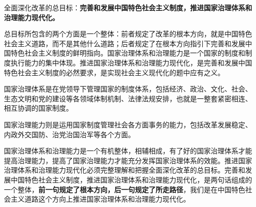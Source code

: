 { }

全面深化改革的总目标：{\textbf{完善和发展中国特色社会主义制度，推进国家治理体系和治理能力现代化。}}

{总目标所包含的两个方面是一个整体：前者规定了改革的根本方向，就是中国特色社会主义道路，而不是其他什么道路；后者规定了在根本方向指引下完善和发展中国特色社会主义制度的鲜明指向。国家治理体系和治理能力是一个国家的制度和制度执行能力的集中体现。推进国家治理体系和治理能力现代化，是完善和发展中国特色社会主义制度的必然要求，是实现社会主义现代化的题中应有之义。}



{{国家治理体系}是在党领导下管理国家的制度体系，包括经济、政治、文化、社会、生态文明和党的建设等各领域体制机制、法律法规安排，也就是一整套紧密相连、相互协调的国家制度。~}

{{国家治理能力}则是运用国家制度管理社会各方面事务的能力，包括改革发展稳定、内政外交国防、治党治国治军等各个方面。~}

{{国家治理体系和治理能力}是一个有机整体，相辅相成，有了好的国家治理体系才能提高治理能力，提高了国家治理能力才能充分发挥国家治理体系的效能。推进国家治理体系和治理能力现代化必须完整理解和把握全面深化改革的总目标。完善和发展中国特色社会主义制度，推进国家治理体系和治理能力现代化，是两句话组成的一个整体，\textbf{{前一句规定了根本方向，后一句规定了所走路径}}，我们是在中国特色社会主义道路这个方向上推进国家治理体系和治理能力现代化。}
